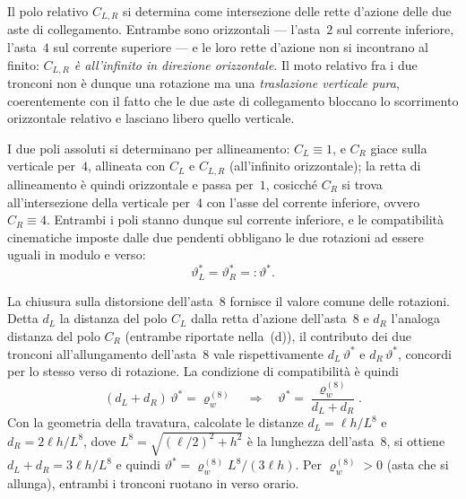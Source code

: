 \begin{esempio}
\begin{svolgimento}
		
		Il polo relativo $C_{L,R}$ si determina come intersezione delle
		rette d'azione delle due aste di collegamento. Entrambe sono
		orizzontali --- l'asta~$2$ sul corrente inferiore, l'asta~$4$ sul
		corrente superiore --- e le loro rette d'azione non si incontrano
		al finito: \emph{$C_{L,R}$ è all'infinito in direzione orizzontale}.
		Il moto relativo fra i due tronconi non è dunque una rotazione ma
		una \emph{traslazione verticale pura}, coerentemente con il fatto
		che le due aste di collegamento bloccano lo scorrimento orizzontale
		relativo e lasciano libero quello verticale.
		
		I due poli assoluti si determinano per allineamento: $C_L\equiv 1$,
		e $C_R$ giace sulla verticale per~$4$, allineata con $C_L$ e
		$C_{L,R}$ (all'infinito orizzontale); la retta di allineamento
		è quindi orizzontale e passa per~$1$, cosicché $C_R$ si trova
		all'intersezione della verticale per~$4$ con l'asse del corrente
		inferiore, ovvero $C_R\equiv 4$. Entrambi i poli stanno dunque
		sul corrente inferiore, e le compatibilità cinematiche imposte
		dalle due pendenti obbligano le due rotazioni ad essere uguali
		in modulo e verso:
		\begin{equation*}
			\vartheta_L^* = \vartheta_R^* =: \vartheta^*.
		\end{equation*}
		
		La chiusura sulla distorsione dell'asta~$8$ fornisce il valore
		comune delle rotazioni. Detta $d_L$ la distanza del polo $C_L$
		dalla retta d'azione dell'asta~$8$ e $d_R$ l'analoga distanza del
		polo $C_R$ (entrambe riportate nella
		\,(d)), il contributo dei due
		tronconi all'allungamento dell'asta~$8$ vale rispettivamente
		$d_L\,\vartheta^*$ e $d_R\,\vartheta^*$, concordi per lo stesso
		verso di rotazione. La condizione di compatibilità è quindi
		\begin{equation*}
			(d_L + d_R)\,\vartheta^* = \varrho_w^{(8)}
			\quad\Longrightarrow\quad
			\vartheta^* = \frac{\varrho_w^{(8)}}{d_L + d_R}.
		\end{equation*}
		Con la geometria della travatura, calcolate le distanze
		$d_L = \ell h/L^{8}$ e $d_R = 2\ell h/L^{8}$, dove
		$L^{8} = \sqrt{(\ell/2)^2 + h^2}$ è la lunghezza dell'asta~$8$, si
		ottiene $d_L+d_R = 3\ell h/L^{8}$ e quindi
		$\vartheta^* = \varrho_w^{(8)} L^{8}/(3\ell h)$. Per $\varrho_w^{(8)}>0$ (asta che si allunga), entrambi i tronconi
		ruotano in verso orario.
		

\end{svolgimento}
\end{esempio}
